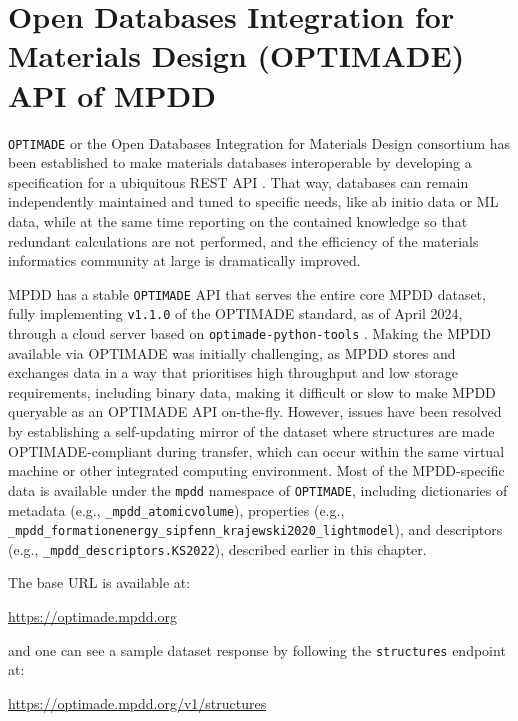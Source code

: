 \section{Open Databases Integration for Materials Design (OPTIMADE) API of MPDD} \label{mpdd:sec:optimade}

\texttt{OPTIMADE} or the Open Databases Integration for Materials Design consortium has been established to make materials databases interoperable by developing a specification for a ubiquitous REST API \cite{Evans2024DevelopmentsExchange}. That way, databases can remain independently maintained and tuned to specific needs, like ab initio data or ML data, while at the same time reporting on the contained knowledge so that redundant calculations are not performed, and the efficiency of the materials informatics community at large is dramatically improved.

MPDD has a stable \texttt{OPTIMADE} API that serves the entire core MPDD dataset, fully implementing \texttt{v1.1.0} of the OPTIMADE standard, as of April 2024, through a cloud server based on \texttt{optimade-python-tools} \cite{Evans2021}.
Making the MPDD available via OPTIMADE was initially challenging, as MPDD stores and exchanges data in a way that prioritises high throughput and low storage requirements, including binary data, making it difficult or slow to make MPDD queryable as an OPTIMADE API on-the-fly.
However, issues have been resolved by establishing a self-updating mirror of the dataset where structures are made OPTIMADE-compliant during transfer, which can occur within the same virtual machine or other integrated computing environment. Most of the MPDD-specific data is available under the \texttt{mpdd} namespace of \texttt{OPTIMADE}, including dictionaries of metadata (e.g., \texttt{\_mpdd\_atomicvolume}), properties (e.g., \texttt{\_mpdd\_formationenergy\_sipfenn\_krajewski2020\_lightmodel}), and descriptors (e.g., \texttt{\_mpdd\_descriptors.KS2022}), described earlier in this chapter.

The base URL is available at:

\hspace{24pt} \href{https://optimade.mpdd.org}{https://optimade.mpdd.org}

and one can see a sample dataset response by following the \texttt{structures} endpoint at:

\hspace{24pt} \href{https://optimade.mpdd.org/v1/structures}{https://optimade.mpdd.org/v1/structures}

